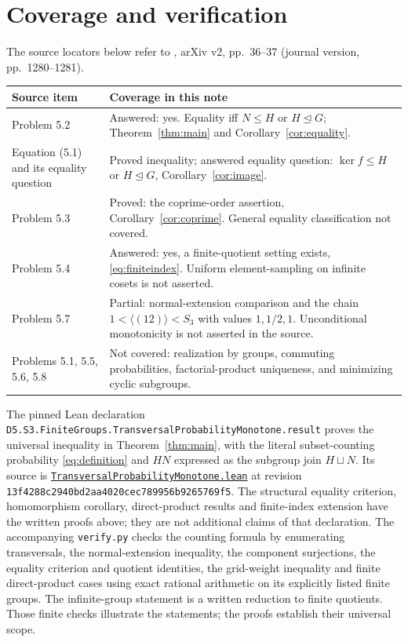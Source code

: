 \documentclass[11pt]{article}
\begin{document}
\section{Coverage and verification}
The source locators below refer to \cite{ALM}, arXiv v2, pp.~36--37
(journal version, pp.~1280--1281).
\begin{center}\small
\begin{tabular}{@{}p{.19\linewidth}p{.74\linewidth}@{}}
\toprule
Source item & Coverage in this note \\
\midrule
Problem 5.2 & Answered: yes. Equality iff $N\leq H$ or
$H\trianglelefteq G$; Theorem~\ref{thm:main} and
Corollary~\ref{cor:equality}. \\
Equation (5.1) and its equality question & Proved inequality;
answered equality question: $\ker f\leq H$ or $H\trianglelefteq G$,
Corollary~\ref{cor:image}. \\
Problem 5.3 & Proved: the coprime-order assertion,
Corollary~\ref{cor:coprime}. General equality classification not covered. \\
Problem 5.4 & Answered: yes, a finite-quotient setting exists,
\eqref{eq:finiteindex}. Uniform element-sampling on infinite cosets is
not asserted. \\
Problem 5.7 & Partial: normal-extension comparison and the chain
$1<\langle(12)\rangle<S_3$ with values $1,1/2,1$.
Unconditional monotonicity is not asserted in the source. \\
Problems 5.1, 5.5, 5.6, 5.8 & Not covered: realization by groups,
commuting probabilities, factorial-product uniqueness, and minimizing
cyclic subgroups. \\
\bottomrule
\end{tabular}
\end{center}

The pinned Lean declaration
\nolinkurl{D5.S3.FiniteGroups.TransversalProbabilityMonotone.result}
proves the universal inequality in Theorem~\ref{thm:main}, with the literal
subset-counting probability \eqref{eq:definition} and $HN$ expressed as
the subgroup join $H\sqcup N$. Its source is
\href{https://github.com/the-omega-institute/trureturing/blob/13f4288c2940bd2aa4020cec789956b9265769f5/D5/S3/FiniteGroups/TransversalProbabilityMonotone.lean}{\nolinkurl{TransversalProbabilityMonotone.lean}}
at revision \texttt{13f4288c2940bd2aa4020cec789956b9265769f5}.
The structural equality criterion, homomorphism corollary, direct-product
results and finite-index extension have the written proofs above;
they are not additional claims of that declaration.
The accompanying \texttt{verify.py} checks the
counting formula by enumerating transversals, the normal-extension
inequality, the component surjections, the equality criterion and quotient
identities, the grid-weight inequality and finite direct-product cases
using exact rational arithmetic on its explicitly listed finite
groups. The infinite-group statement is a written reduction to finite
quotients. Those finite checks illustrate the statements; the proofs establish
their universal scope.
\end{document}
